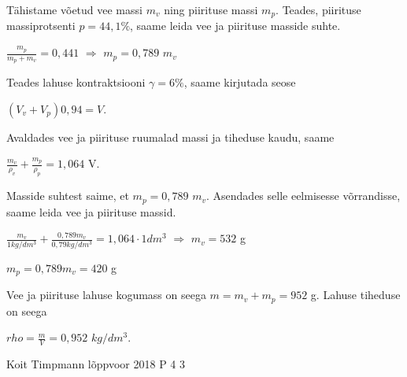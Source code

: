 \documentclass[11pt]{article}
\begin{document}
{{\ifSolution
Tähistame võetud vee massi $m_v$ ning piirituse massi $m_p$. Teades, piirituse massiprotsenti $p = 44,1 \%$, saame leida vee ja piirituse masside suhte.
\begin{center}
$\frac{m_p}{m_p + m_v} = 0,441$ $\Rightarrow$ $m_p = 0,789$ $m_v$ 
\end{center}
Teades lahuse kontraktsiooni $\gamma = 6 \%$, saame kirjutada seose
\begin{center}
$(V_v + V_p)0,94 = V$.
\end{center}
Avaldades vee ja piirituse ruumalad massi ja tiheduse kaudu, saame
\begin{center}
$\frac{m_v}{\rho_v} + \frac{m_p}{\rho_p} = 1,064$ V.
\end{center}
Masside suhtest saime, et $m_p = 0,789$ $m_v$. Asendades selle eelmisesse võrrandisse, saame leida vee ja piirituse massid.
\begin{center}
$\frac{m_v}{1 kg/dm^3} + \frac{0,789m_v}{0,79 kg/dm^3} = 1,064 \cdot 1 dm^3$ $\Rightarrow$ $m_v = 532$ g
\end{center}
\begin{center}
$m_p = 0,789m_v = 420$ g 
\end{center}
Vee ja piirituse lahuse kogumass on seega $m = m_v + m_p = 952$ g. Lahuse tiheduse on seega
\begin{center}
$rho = \frac{m}{V} = 0,952$ $kg/dm^3$.
\end{center}
\fi
}

{Koit Timpmann} %
{lõppvoor} %
{2018} %
{P 4} %
{3} %
{

}}
\end{document}
